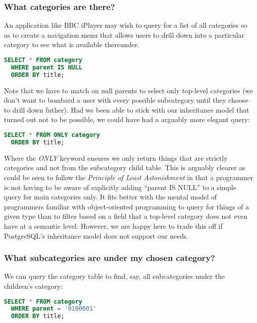 \documentclass[11pt,a4paper]{article}
\begin{document}
\subsubsection{What categories are there?}

An application like BBC iPlayer may wish to query for a list of all
categories so as to create a navigation menu that allows users
to drill down into a particular category to see what is
available thereunder.

\begin{lstlisting}[language=SQL]
  SELECT * FROM category
  WHERE parent IS NULL
  ORDER BY title;
\end{lstlisting}

Note that we have to match on null parents to select only
top-level categories (we don't want to bombard a user with every
possible subcategory until they choose to drill down futher). Had
we been able to stick with our inheritance model that turned out
not to be possible, we could have had a arguably more elegant
query:

\begin{lstlisting}[language=SQL]
  SELECT * FROM ONLY category
  ORDER BY title;
\end{lstlisting}

Where the \emph{ONLY} keyword ensures we only return things that
are strictly categories and not from the subcategory child table.
This is arguably clearer as could be seen to follow the
\emph{Principle of Least Astonishment}
\cite{saltzer2009principles}
in that a programmer
is not having to be aware of explicitly adding ``parent IS NULL''
to a simple query for main categories only. It fits better with
the mental model of programmers familiar with object-oriented
programming to query for things of a given type than to filter
based on a field that a top-level category does not even have
at a semantic level. However, we are happy here to trade this
off if PostgreSQL's inheritance model does not support our needs.

\subsubsection{What subcategories are under my chosen category?}

We can query the category table to find, say, all subcategories under
the children's category:

\begin{lstlisting}[language=SQL]
  SELECT * FROM category
  WHERE parent = '9100001'
  ORDER BY title;
\end{lstlisting}
\end{document}
